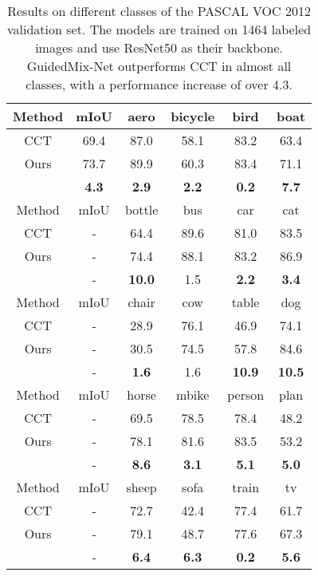 \begin{table}[t]
\centering
\caption{Results on different classes of the PASCAL VOC 2012 validation set.
The models are trained on 1464 labeled images and use ResNet50 as their backbone.
GuidedMix-Net outperforms CCT in almost all classes, with a performance increase of over 4.3.}
\begin{tabular}{c|c|c|c|c|c}
\hline
Method & mIoU & aero & bicycle & bird & boat  \\\hline
CCT    & 69.4 & 87.0 & 58.1    & 83.2 & 63.4    \\\hline
Ours   & 73.7 & 89.9 & 60.3   & 83.4  & 71.1   \\\hline
&\textbf{4.3}&\textbf{2.9}&\textbf{2.2}&\textbf{0.2}&\textbf{7.7}\\\hline\hline

Method & mIoU & bottle & bus & car & cat\\\hline
CCT    & - & 64.4 & 89.6 & 81.0& 83.5\\\hline
Ours   & - & 74.4 & 88.1  & 83.2  & 86.9\\\hline
&- &\textbf{10.0}&1.5&\textbf{2.2}&\textbf{3.4}\\\hline\hline

Method & mIoU & chair & cow & table & dog\\\hline
CCT    & - & 28.9 & 76.1    & 46.9 & 74.1\\\hline
Ours   & - & 30.5 & 74.5   & 57.8  & 84.6\\\hline
&- &\textbf{1.6}&1.6&\textbf{10.9}&\textbf{10.5}\\\hline\hline

Method & mIoU & horse & mbike & person & plan\\\hline
CCT    & - & 69.5 & 78.5    & 78.4 & 48.2\\\hline
Ours   & - & 78.1 & 81.6   & 83.5  & 53.2\\\hline
&- &\textbf{8.6}&\textbf{3.1}&\textbf{5.1}&\textbf{5.0}\\\hline\hline

Method & mIoU & sheep & sofa & train & tv\\\hline
CCT    & - & 72.7 & 42.4    & 77.4 & 61.7\\\hline
Ours   & - & 79.1 & 48.7   & 77.6  & 67.3\\\hline
&- &\textbf{6.4}&\textbf{6.3}&\textbf{0.2}&\textbf{5.6}\\\hline
\end{tabular}
\label{perclass_miou}
\end{table}


